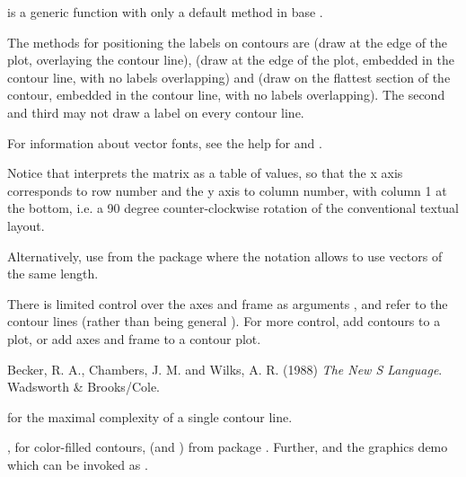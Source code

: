 %
\begin{Details}\relax
{} is a generic function with only a default method in
base \R{}.

The methods for positioning the labels on contours are 
(draw at the edge of the plot, overlaying the contour line),
 (draw at the edge of the plot, embedded in the contour
line, with no labels overlapping) and 
(draw on the flattest section of the contour, embedded in the
contour line, with no labels overlapping).  The second and third may
not draw a label on every contour line.

For information about vector fonts, see the
help for  and .

Notice that  interprets the  matrix as a table of
 values, so that the x axis corresponds to row
number and the y axis to column number, with column 1 at the bottom,
i.e. a 90 degree counter-clockwise rotation of the conventional textual
layout.

Alternatively, use  from the
 package where the  notation allows
to use vectors  of the same length.

There is limited control over the axes and frame as arguments
,  and  refer to the contour lines
(rather than being general ).  For more control,
add contours to a plot, or add axes and frame to a contour plot.
\end{Details}
%
\begin{References}\relax
Becker, R. A., Chambers, J. M. and Wilks, A. R. (1988)
\emph{The New S Language}.
Wadsworth \& Brooks/Cole.
\end{References}
%
\begin{SeeAlso}\relax
{} for the maximal
complexity of a single contour line.

, 
for color-filled contours,
 (and
) from package .
Further,  and the graphics demo which can be
invoked as .
\end{SeeAlso}
